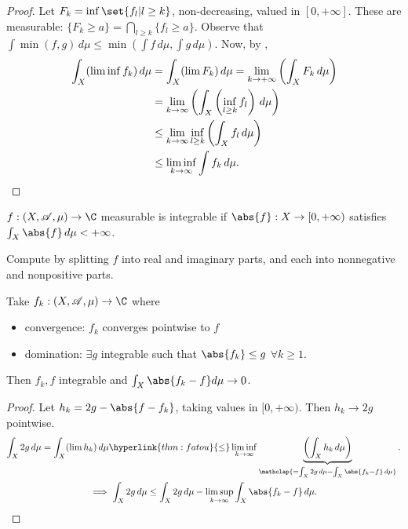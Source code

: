 \documentclass{article}
\begin{document}
\begin{proof}
    Let $F_k = \inf\set{f_l | l \geq k}$, non-decreasing, valued in $[0, +\infty]$.
    These are measurable: $\{F_k \geq a\} = \bigcap_{l \geq k} \{f_l \geq a\}$.
    Observe that $\int \min(f, g) \, d\mu \leq \min(\int f \, d\mu, \int g \, d\mu)$.
    Now, by \hyperlink{thm:Beppo},
    \begin{align*}
        \int_X (\liminf f_k) \, d\mu &= \int_X (\lim F_k) \, d\mu = \lim_{k \to +\infty} \left(\int_X F_k \, d\mu\right) \\
                                     &= \lim_{k \to \infty} \left(\int_X \left( \inf_{l \geq k} f_l\right) \, d\mu\right) \\
                                     &\leq \lim_{k \to \infty} \inf_{l \geq k} \left(\int_X f_l \, d\mu\right)\\
                                     &\leq \liminf_{k \to \infty} \int f_k \, d\mu.\qedhere
    \end{align*}
\end{proof}
\begin{defi}[Integrable]
    $f: (X, \mathscr{A}, \mu) \to \C$ measurable is integrable if $\abs{f}: X \to [0, +\infty)$ satisfies $\int_X \abs{f} \, d\mu < +\infty$.
\end{defi}
Compute by splitting $f$ into real and imaginary parts, and each into nonnegative and nonpositive parts.

\begin{thm}
    Take $f_k: (X, \mathscr{A}, \mu) \to \C$ where
    \begin{itemize}
        \item convergence: $f_k$ converges pointwise to $f$
        \item domination: $\exists g$ integrable such that $\abs{f_k} \leq g$ $\forall k \geq 1$.
    \end{itemize}
    Then $f_k, f$ integrable and $\int_X \abs{f_k - f} d \mu \to 0$.
\end{thm}

\begin{proof}
    Let $h_k = 2g - \abs{f - f_k}$, taking values in $[0, +\infty)$.
    Then $h_k \to 2g$ pointwise.
    \begin{gather*}
        \int_X 2g \, d\mu = \int_X (\lim h_k) \, d\mu \hyperlink{thm:fatou}{\leq} \liminf_{k \to \infty} \underbrace{\left(\int_X h_k \, d\mu\right)}_{\mathclap{ = \int_X 2g \, d\mu - \int_X \abs{f_k-f} \, d\mu}}. \\
        \implies \int_X 2g \, d\mu \leq \int_X 2g \, d\mu - \limsup_{k \to \infty} \int_X \abs{f_k - f} \, d\mu.\qedhere
    \end{gather*}
\end{proof}
\end{document}

